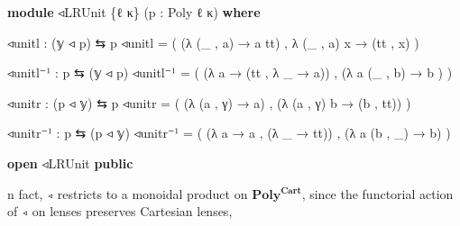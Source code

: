\documentclass[
  11pt,
  oneside,
  article]{memoir}
\newenvironment{Shaded}{}{}
\newcommand{\KeywordTok}[1]{\textcolor[rgb]{0.00,0.44,0.13}{\textbf{#1}}}
\newcommand{\NormalTok}[1]{#1}
\newcommand{\OtherTok}[1]{\textcolor[rgb]{0.00,0.44,0.13}{#1}}
\theoremstyle{definition}
\theoremstyle{plain}
\newcommand{\0}{\textsf{0}}
\newcommand{\1}{\tn{\textsf{1}}}
\begin{document}
\begin{Shaded}
\begin{Highlighting}[]
\KeywordTok{module}\NormalTok{ ◃LRUnit }\OtherTok{\{}\NormalTok{ℓ κ}\OtherTok{\}} \OtherTok{(}\NormalTok{p }\OtherTok{:}\NormalTok{ Poly ℓ κ}\OtherTok{)} \KeywordTok{where}

\NormalTok{    ◃unitl }\OtherTok{:} \OtherTok{(}\NormalTok{𝕪 ◃ p}\OtherTok{)}\NormalTok{ ⇆ p}
\NormalTok{    ◃unitl }\OtherTok{=} \OtherTok{(} \OtherTok{(λ} \OtherTok{(\_}\NormalTok{ , a}\OtherTok{)} \OtherTok{→}\NormalTok{ a tt}\OtherTok{)}\NormalTok{ , }\OtherTok{λ} \OtherTok{(\_}\NormalTok{ , a}\OtherTok{)}\NormalTok{ x }\OtherTok{→} \OtherTok{(}\NormalTok{tt , x}\OtherTok{)} \OtherTok{)}

\NormalTok{    ◃unitl⁻¹ }\OtherTok{:}\NormalTok{ p ⇆ }\OtherTok{(}\NormalTok{𝕪 ◃ p}\OtherTok{)}
\NormalTok{    ◃unitl⁻¹ }\OtherTok{=} \OtherTok{(} \OtherTok{(λ}\NormalTok{ a }\OtherTok{→} \OtherTok{(}\NormalTok{tt , }\OtherTok{λ} \OtherTok{\_} \OtherTok{→}\NormalTok{ a}\OtherTok{))}\NormalTok{ , }\OtherTok{(λ}\NormalTok{ a }\OtherTok{(\_}\NormalTok{ , b}\OtherTok{)} \OtherTok{→}\NormalTok{ b }\OtherTok{)} \OtherTok{)}

\NormalTok{    ◃unitr }\OtherTok{:} \OtherTok{(}\NormalTok{p ◃ 𝕪}\OtherTok{)}\NormalTok{ ⇆ p}
\NormalTok{    ◃unitr }\OtherTok{=} \OtherTok{(} \OtherTok{(λ} \OtherTok{(}\NormalTok{a , γ}\OtherTok{)} \OtherTok{→}\NormalTok{ a}\OtherTok{)}\NormalTok{ , }\OtherTok{(λ} \OtherTok{(}\NormalTok{a , γ}\OtherTok{)}\NormalTok{ b }\OtherTok{→} \OtherTok{(}\NormalTok{b , tt}\OtherTok{))} \OtherTok{)}

\NormalTok{    ◃unitr⁻¹ }\OtherTok{:}\NormalTok{ p ⇆ }\OtherTok{(}\NormalTok{p ◃ 𝕪}\OtherTok{)}
\NormalTok{    ◃unitr⁻¹ }\OtherTok{=} \OtherTok{(} \OtherTok{(λ}\NormalTok{ a }\OtherTok{→}\NormalTok{ a , }\OtherTok{(λ} \OtherTok{\_} \OtherTok{→}\NormalTok{ tt}\OtherTok{))}\NormalTok{ , }\OtherTok{(λ}\NormalTok{ a }\OtherTok{(}\NormalTok{b , }\OtherTok{\_)} \OtherTok{→}\NormalTok{ b}\OtherTok{)} \OtherTok{)}

\KeywordTok{open}\NormalTok{ ◃LRUnit }\KeywordTok{public}
\end{Highlighting}
\end{Shaded}

n fact, \texttt{◃} restricts to a monoidal product on
\(\mathbf{Poly^{Cart}}\), since the functorial action of \texttt{◃} on
lenses preserves Cartesian lenses,
\end{document}
